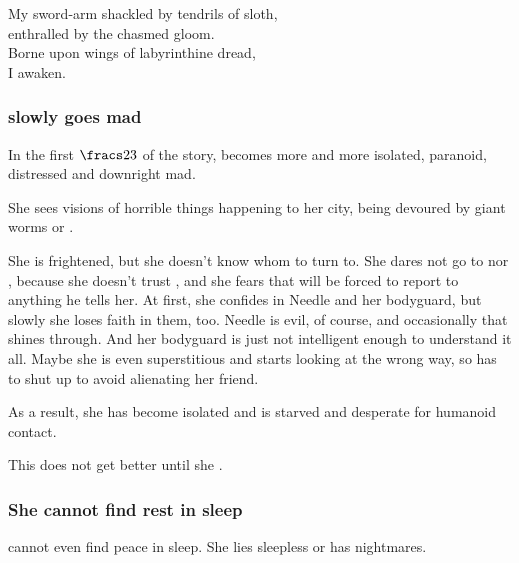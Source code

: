 \begin{garbage}
{  My sword-arm shackled by tendrils of sloth,\\
  enthralled by the chasmed gloom.\\
  Borne upon wings of labyrinthine dread,\\
  I awaken.
}






\subsubsection{\Tiroco{} slowly goes mad}
In the first $\fracs 2 3$ of the story, \Tiroco{} becomes more and more isolated, paranoid, distressed and downright mad. 

She sees visions of horrible things happening to her city, being devoured by giant worms or . 

She is frightened, but she doesn't know whom to turn to. 
She dares not go to \Psyrex{} nor \Icor, because she doesn't trust \Psyrex, and she fears that \Icor{} will be forced to report to \Psyrex{} anything he tells her. 
At first, she confides in Needle and her bodyguard, but slowly she loses faith in them, too. 
Needle is evil, of course, and occasionally that shines through. 
And her bodyguard is just not intelligent enough to understand it all. 
Maybe she is even superstitious and starts looking at \Tiroco{} the wrong way, so \Tiroco{} has to shut up to avoid alienating her friend.

As a result, she has become isolated and is starved and desperate for humanoid contact. 

This does not get better until she . 





\subsubsection{She cannot find rest in sleep}
\Tiroco{} cannot even find peace in sleep. 
She lies sleepless or has nightmares. 


\end{garbage}
